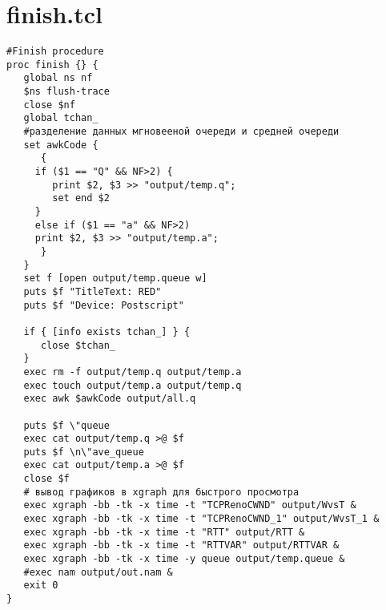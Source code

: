 \section*{finish.tcl}
\label{app1:sec7}
\begin{verbatim}
#Finish procedure
proc finish {} {
   global ns nf
   $ns flush-trace
   close $nf
   global tchan_
   #разделение данных мгновееной очереди и средней очереди
   set awkCode {
      {
	 if ($1 == "Q" && NF>2) {
	    print $2, $3 >> "output/temp.q";
	    set end $2
	 }
	 else if ($1 == "a" && NF>2)
	 print $2, $3 >> "output/temp.a";
      }
   }
   set f [open output/temp.queue w]
   puts $f "TitleText: RED"
   puts $f "Device: Postscript"

   if { [info exists tchan_] } {
      close $tchan_
   }
   exec rm -f output/temp.q output/temp.a 
   exec touch output/temp.a output/temp.q
   exec awk $awkCode output/all.q

   puts $f \"queue
   exec cat output/temp.q >@ $f
   puts $f \n\"ave_queue
   exec cat output/temp.a >@ $f
   close $f
   # вывод графиков в xgraph для быстрого просмотра
   exec xgraph -bb -tk -x time -t "TCPRenoCWND" output/WvsT &
   exec xgraph -bb -tk -x time -t "TCPRenoCWND_1" output/WvsT_1 &
   exec xgraph -bb -tk -x time -t "RTT" output/RTT &
   exec xgraph -bb -tk -x time -t "RTTVAR" output/RTTVAR &
   exec xgraph -bb -tk -x time -y queue output/temp.queue &
   #exec nam output/out.nam &
   exit 0
}
\end{verbatim}


